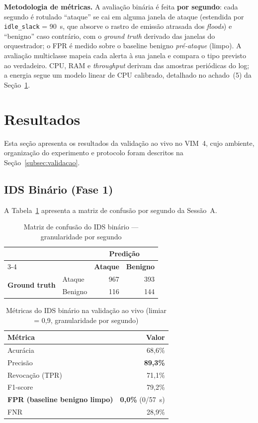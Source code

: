 \documentclass[12pt]{article}
\begin{document}
\textbf{Metodologia de métricas.} A avaliação binária é feita \textbf{por
segundo}: cada segundo é rotulado ``ataque'' se cai em alguma janela de ataque
(estendida por \texttt{idle\_slack} = 90~s, que absorve o rastro de emissão
atrasada dos \textit{floods}) e ``benigno'' caso contrário, com o \textit{ground
truth} derivado das janelas do orquestrador; o FPR é medido sobre o baseline
benigno \textit{pré-ataque} (limpo). A avaliação multiclasse mapeia cada alerta à
sua janela e compara o tipo previsto ao verdadeiro. CPU, RAM e \textit{throughput}
derivam das amostras periódicas do log; a energia segue um modelo linear de CPU
calibrado, detalhado no achado~(5) da Seção~\ref{sec:resultados}.

\section{Resultados}
\label{sec:resultados}

Esta seção apresenta os resultados da validação ao vivo no VIM~4, cujo ambiente,
organização do experimento e protocolo foram descritos na
Seção~\ref{subsec:validacao}.

\subsection{IDS Binário (Fase 1)}

A Tabela~\ref{tab:bin_cm} apresenta a matriz de confusão por segundo da Sessão~A.

\begin{table}[ht]
\centering
\caption{Matriz de confusão do IDS binário — granularidade por segundo}
\label{tab:bin_cm}
\begin{tabular}{@{}llrr@{}}
\toprule
& & \multicolumn{2}{c}{\textbf{Predição}} \\
\cmidrule{3-4}
& & \textbf{Ataque} & \textbf{Benigno} \\ \midrule
\multirow{2}{*}{\textbf{Ground truth}}
  & Ataque & 967 & 393 \\
  & Benigno & 116 & 144 \\ \bottomrule
\end{tabular}
\end{table}

\begin{table}[ht]
\centering
\caption{Métricas do IDS binário na validação ao vivo (limiar = 0,9, granularidade por segundo)}
\label{tab:bin_metrics}
\begin{tabular}{@{}lr@{}}
\toprule
\textbf{Métrica} & \textbf{Valor} \\ \midrule
Acurácia          & 68,6\% \\
Precisão          & \textbf{89,3\%} \\
Revocação (TPR)   & 71,1\% \\
F1-score          & 79,2\% \\
\textbf{FPR (baseline benigno limpo)} & \textbf{0,0\%} (0/57~s) \\
FNR               & 28,9\% \\ \bottomrule
\end{tabular}
\end{table}
\end{document}
